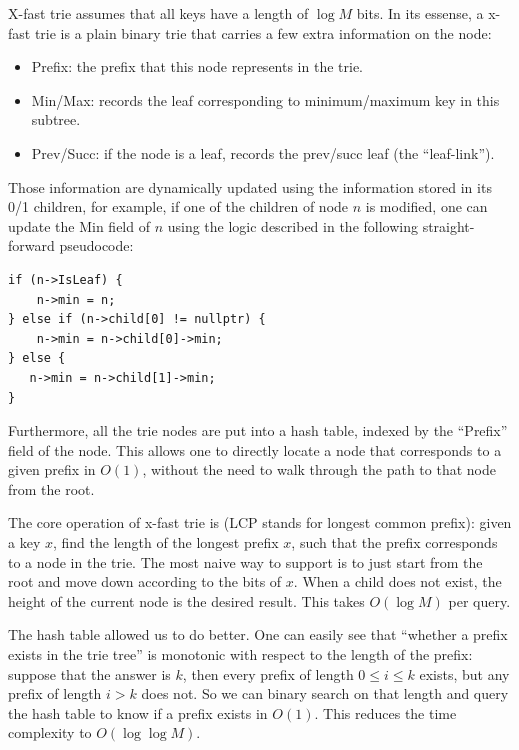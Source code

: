 \documentclass[11pt, usletter]{article}
\begin{document}
X-fast trie assumes that all keys have a length of $\log M$ bits.
In its essense, a x-fast trie is a plain binary trie that carries a few extra information on the node:
\begin{itemize}
[topsep=0pt,partopsep=0pt,itemsep=0pt,parsep=0pt,fullwidth,itemindent=\parindent,listparindent=\parindent]
\item Prefix: the prefix that this node represents in the trie.
\item Min/Max: records the leaf corresponding to minimum/maximum key in this subtree.
\item Prev/Succ: if the node is a leaf, records the prev/succ leaf (the ``leaf-link'').
\end{itemize}
Those information are dynamically updated using the information stored in its 0/1 children, 
for example, if one of the children of node $n$ is modified, one can update the Min field of $n$ 
using the logic described in the following straight-forward pseudocode:

\singlespacing\begin{codebox}
\begin{verbatim}
if (n->IsLeaf) {
    n->min = n;
} else if (n->child[0] != nullptr) {
    n->min = n->child[0]->min;
} else {
   n->min = n->child[1]->min;
}
\end{verbatim}
\end{codebox}\doublespacing

Furthermore, all the trie nodes are put into a hash table, indexed by the ``Prefix'' field of the node. 
This allows one to directly locate a node that corresponds to a given prefix in $O(1)$, without the need to walk through the path 
to that node from the root. 

The core operation of x-fast trie is \QueryLCP (LCP stands for longest common prefix): 
given a key $x$, find the length of the longest prefix $x$, 
such that the prefix corresponds to a node in the trie. The most naive way to support \QueryLCP is to just 
start from the root and move down according to the bits of $x$. When a child does not exist, 
the height of the current node is the desired result. This takes $O(\log M)$ per query.

The hash table allowed us to do better. One can easily see that ``whether a prefix exists in the trie tree'' 
is monotonic with respect to the length of the prefix: suppose that the answer is $k$, 
then every prefix of length $0\leq i\leq k$ exists, but any prefix of length $i>k$ does not. 
So we can binary search on that length and query the hash table to know if a prefix exists in $O(1)$. 
This reduces the time complexity to $O(\log\log M)$. 
\end{document}
